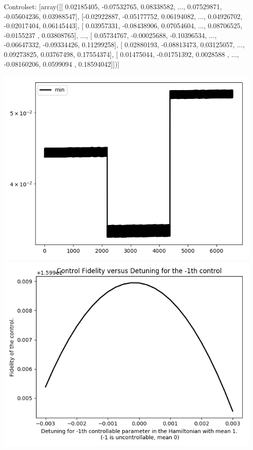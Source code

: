 \documentclass{article}
\begin{document}
Controlset: [array([[ 0.02185405, -0.07532765,  0.08338582, ...,  0.07529871,
        -0.05604236,  0.03988547],
       [-0.02922887, -0.05177752,  0.06194082, ...,  0.04926702,
        -0.02017404,  0.06145443],
       [ 0.03957331, -0.08438906,  0.07054604, ...,  0.08706525,
        -0.0155237 ,  0.03808765],
       ..., 
       [ 0.05734767, -0.00025688, -0.10396534, ..., -0.06647332,
        -0.09334426,  0.11299258],
       [ 0.02880193, -0.08813473,  0.03125057, ...,  0.09273825,
         0.03767498,  0.17554374],
       [ 0.01475044, -0.01751392,  0.0028588 , ..., -0.08160206,
         0.0599094 ,  0.18594042]])]
\begin{center}
\includegraphics[scale=.9]{report_pickled_controls25/control_dpn_all}
\includegraphics[scale=.9]{control_fid_0}

\end{center}
\end{document}
